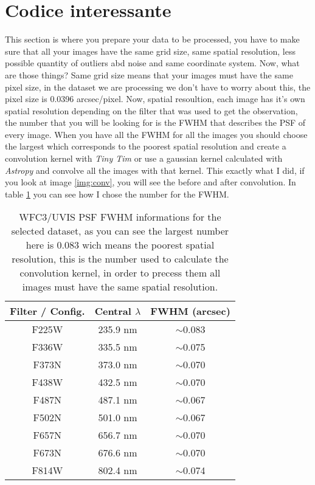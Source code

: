 \documentclass[11pt,fleqn]{book} %
\begin{document}
\section{Codice interessante}
This section is where you prepare your data to be processed, you have to make sure that all your images have the same grid size, same spatial resolution, less possible quantity of outliers abd noise and same coordinate system. Now, what are those things? Same grid size means that your images must have the same pixel size, in the dataset we are processing we don't have to worry about this, the pixel size is 0.0396 arcsec/pixel. Now, spatial resoultion, each image has it's own spatial resolution depending on the filter that was used to get the observation, the number that you will be looking for is the FWHM that describes the PSF of every image. When you have all the FWHM for all the images you should choose the largest which corresponds to the poorest spatial resolution and create a convolution kernel with \emph{Tiny Tim} or use a gaussian kernel calculated with \emph{Astropy} and convolve all the images with that kernel. This exactly what I did, if you look at image \ref{img:conv}, you will see the before and after convolution. In table \ref{tab:dos} you can see how I chose the number for the FWHM.


\begin{table}[h]
  \centering
    \begin{tabular}{ c c c }
    \hline\hline
    
    Filter / Config. & Central $\lambda$ & FWHM (arcsec)\\
    \hline
    
    F225W & 235.9 nm & $\sim$0.083\\
    
    F336W & 335.5 nm & $\sim$0.075\\
    
    F373N & 373.0 nm & $\sim$0.070\\
    
    F438W & 432.5 nm & $\sim$0.070\\
    
    F487N & 487.1 nm & $\sim$0.067\\
    
    F502N & 501.0 nm & $\sim$0.067\\
    
    F657N & 656.7 nm & $\sim$0.070\\
    
    F673N & 676.6 nm & $\sim$0.070\\
    
    F814W & 802.4 nm & $\sim$0.074\\
    
    \hline
  \end{tabular}
  \caption{WFC3/UVIS PSF FWHM informations for the selected dataset, as you can see the largest number here is 0.083 wich means the poorest spatial resolution, this is the number used to calculate the convolution kernel, in order to precess them all images must have the same spatial resolution.}
  \label{tab:dos}
\end{table}
\end{document}
